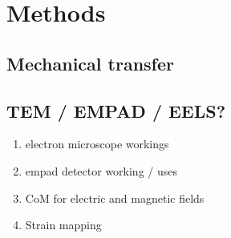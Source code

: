 \section{Methods}
\subsection{Mechanical transfer}
\subsection{TEM / EMPAD / EELS?}
\begin{enumerate}
    \item electron microscope workings
    \item empad detector working / uses
    \item CoM for electric and magnetic fields
    \item Strain mapping
\end{enumerate}
